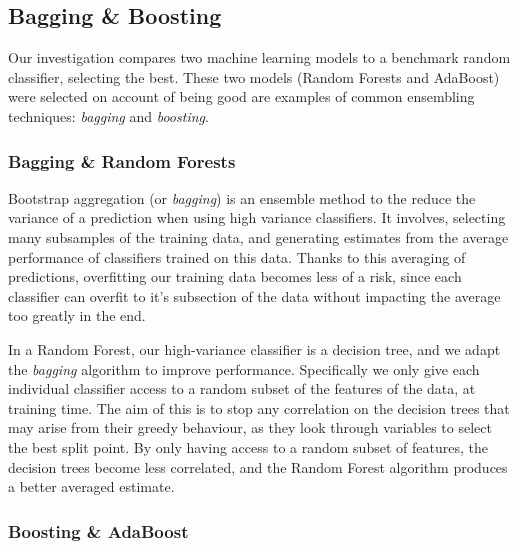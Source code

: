 \documentclass{bioinfo}
\begin{document}

\subsection{Bagging \& Boosting}
Our investigation compares two machine learning models to a benchmark random classifier, selecting the best. 
These two models (Random Forests and AdaBoost) were selected on account of being good are examples of common ensembling techniques: \textit{bagging} and \textit{boosting}.

\subsubsection{Bagging \& Random Forests}

Bootstrap aggregation (or \textit{bagging}) is an ensemble method to the reduce the variance of a prediction when using high variance classifiers. 
It involves, selecting many subsamples of the training data, and generating estimates from the average performance of classifiers trained on this data. 
Thanks to this averaging of predictions, overfitting our training data becomes less of a risk, since each classifier can overfit to it's subsection of the data without impacting the average too greatly in the end.

In a Random Forest, our high-variance classifier is a decision tree, and we adapt the \textit{bagging} algorithm to improve performance.
Specifically we only give each individual classifier access to a random subset of the features of the data, at training time.
The aim of this is to stop any correlation on the decision trees that may arise from their greedy behaviour, as they look through variables to select the best split point. 
By only having access to a random subset of features, the decision trees become less correlated, and the Random Forest algorithm produces a better averaged estimate.

\subsubsection{Boosting \& AdaBoost}
\end{document}
